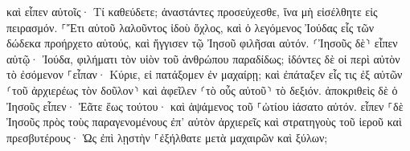 \documentclass{openreader}
\begin{document}
καὶ εἶπεν αὐτοῖς· Τί καθεύδετε; ἀναστάντες προσεύχεσθε, ἵνα μὴ εἰσέλθητε εἰς πειρασμόν. 
⸀Ἔτι αὐτοῦ λαλοῦντος ἰδοὺ ὄχλος, καὶ ὁ λεγόμενος Ἰούδας εἷς τῶν δώδεκα προήρχετο αὐτούς, καὶ ἤγγισεν τῷ Ἰησοῦ φιλῆσαι αὐτόν. 
⸂Ἰησοῦς δὲ⸃ εἶπεν αὐτῷ· Ἰούδα, φιλήματι τὸν υἱὸν τοῦ ἀνθρώπου παραδίδως; 
ἰδόντες δὲ οἱ περὶ αὐτὸν τὸ ἐσόμενον ⸀εἶπαν· Κύριε, εἰ πατάξομεν ἐν μαχαίρῃ; 
καὶ ἐπάταξεν εἷς τις ἐξ αὐτῶν ⸂τοῦ ἀρχιερέως τὸν δοῦλον⸃ καὶ ἀφεῖλεν ⸂τὸ οὖς αὐτοῦ⸃ τὸ δεξιόν. 
ἀποκριθεὶς δὲ ὁ Ἰησοῦς εἶπεν· Ἐᾶτε ἕως τούτου· καὶ ἁψάμενος τοῦ ⸀ὠτίου ἰάσατο αὐτόν. 
εἶπεν ⸀δὲ Ἰησοῦς πρὸς τοὺς παραγενομένους ἐπ’ αὐτὸν ἀρχιερεῖς καὶ στρατηγοὺς τοῦ ἱεροῦ καὶ πρεσβυτέρους· Ὡς ἐπὶ λῃστὴν ⸀ἐξήλθατε μετὰ μαχαιρῶν καὶ ξύλων; 
\end{document}
